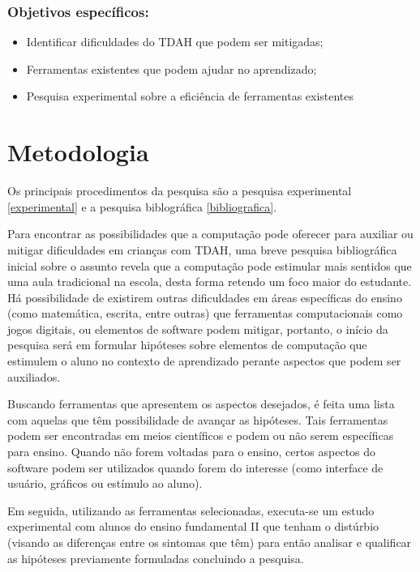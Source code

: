 \subsection{Objetivos específicos:}

\begin{itemize}
    \item Identificar dificuldades do TDAH que podem ser mitigadas;
    \item Ferramentas existentes que podem ajudar no aprendizado;
    \item Pesquisa experimental sobre a eficiência de ferramentas existentes
\end{itemize}


\chapter{Metodologia}

Os principais procedimentos da pesquisa são a pesquisa experimental \ref{experimental} e a pesquisa biblográfica \ref{bibliografica}.

Para encontrar as possibilidades que a computação pode oferecer para auxiliar ou mitigar dificuldades em crianças com TDAH, uma breve pesquisa bibliográfica inicial sobre o assunto revela que a computação pode estimular mais sentidos que uma aula tradicional na escola, desta forma retendo um foco maior do estudante. Há possibilidade de existirem outras dificuldades em áreas específicas do ensino (como matemática, escrita, entre outras) que ferramentas computacionais como jogos digitais, ou elementos de software podem mitigar, portanto, o início da pesquisa será em formular hipóteses sobre elementos de computação que estimulem o aluno no contexto de aprendizado perante aspectos que podem ser auxiliados.

Buscando ferramentas que apresentem os aspectos desejados, é feita uma lista com aquelas que têm possibilidade de avançar as hipóteses. Tais ferramentas podem ser encontradas em meios científicos e podem ou não serem específicas para ensino. Quando não forem voltadas para o ensino, certos aspectos do software podem ser utilizados quando forem do interesse (como interface de usuário, gráficos ou estímulo ao aluno).

Em seguida, utilizando as ferramentas selecionadas, executa-se um estudo experimental com alunos do ensino fundamental II que tenham o distúrbio (visando as diferenças entre os sintomas que têm) para então analisar e qualificar as hipóteses previamente formuladas concluindo a pesquisa.
